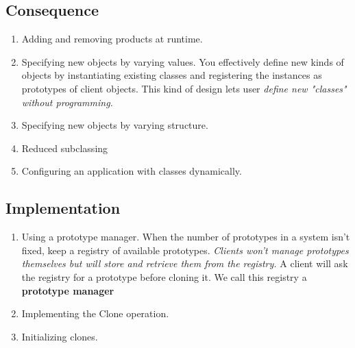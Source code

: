 \documentclass[11pt, a4paper]{book}
\begin{document}
\subsection{Consequence}
\begin{enumerate}
    \item Adding and removing products at runtime.
    \item Specifying new objects by varying values. You effectively define new
        kinds of objects by instantiating existing classes and registering the
        instances as prototypes of client objects. This kind of design lets user
        \emph{define new "classes" without programming.}
    \item Specifying new objects by varying structure.
    \item Reduced subclassing
    \item Configuring an application with classes dynamically.
\end{enumerate}
\subsection{Implementation}
\begin{enumerate}
    \item Using a prototype manager. When the number of prototypes in a system
        isn't fixed, keep a registry of available prototypes. \emph{Clients
            won't manage prototypes themselves but will store and retrieve them
        from the registry.} A client will ask the registry for a prototype
        before cloning it. We call this registry a \textbf{prototype manager}
    \item Implementing the Clone operation.
    \item Initializing clones.
\end{enumerate}
\end{document}

